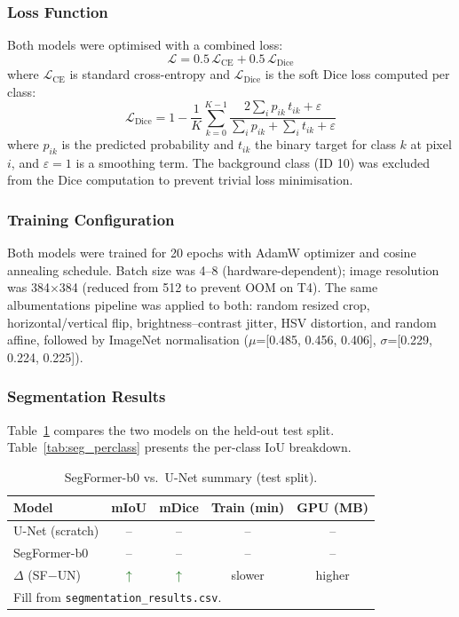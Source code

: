\documentclass[10pt,twocolumn]{article}
\begin{document}
\subsubsection{Loss Function}

Both models were optimised with a combined loss:
\begin{equation}
  \mathcal{L} = 0.5\,\mathcal{L}_{\text{CE}} + 0.5\,\mathcal{L}_{\text{Dice}}
\end{equation}
where $\mathcal{L}_{\text{CE}}$ is standard cross-entropy and
$\mathcal{L}_{\text{Dice}}$ is the soft Dice loss computed per class:
\begin{equation}
  \mathcal{L}_{\text{Dice}} = 1 - \frac{1}{K}\sum_{k=0}^{K-1}
    \frac{2\sum_i p_{ik}\,t_{ik} + \varepsilon}
         {\sum_i p_{ik} + \sum_i t_{ik} + \varepsilon}
\end{equation}
where $p_{ik}$ is the predicted probability and $t_{ik}$ the binary target for
class $k$ at pixel $i$, and $\varepsilon{=}1$ is a smoothing term.
The background class (ID 10) was excluded from the Dice computation to prevent
trivial loss minimisation.

\subsubsection{Training Configuration}

Both models were trained for 20 epochs with AdamW optimizer and cosine
annealing schedule.  Batch size was 4--8 (hardware-dependent); image resolution
was 384$\times$384 (reduced from 512 to prevent OOM on T4).
The same albumentations pipeline was applied to both:
random resized crop, horizontal/vertical flip, brightness--contrast jitter,
HSV distortion, and random affine, followed by ImageNet normalisation
($\mu$=[0.485, 0.456, 0.406], $\sigma$=[0.229, 0.224, 0.225]).

\subsubsection{Segmentation Results}

Table~\ref{tab:seg_summary} compares the two models on the held-out test split.
Table~\ref{tab:seg_perclass} presents the per-class IoU breakdown.

\begin{table}[H]
\centering
\caption{SegFormer-b0 vs.\ U-Net summary (test split).}
\label{tab:seg_summary}
\small
\begin{tabular}{@{}lcccc@{}}
\toprule
\textbf{Model} & \textbf{mIoU} & \textbf{mDice} & \textbf{Train (min)} & \textbf{GPU (MB)} \\
\midrule
U-Net (scratch) & -- & -- & -- & -- \\
SegFormer-b0    & -- & -- & -- & -- \\
\midrule
$\Delta$ (SF$-$UN) & \textcolor{darkgreen}{$\uparrow$} & \textcolor{darkgreen}{$\uparrow$} & \textcolor{accent}{slower} & \textcolor{accent}{higher} \\
\bottomrule
\multicolumn{5}{l}{\scriptsize Fill from \texttt{segmentation\_results.csv}.}
\end{tabular}
\end{table}
\end{document}

